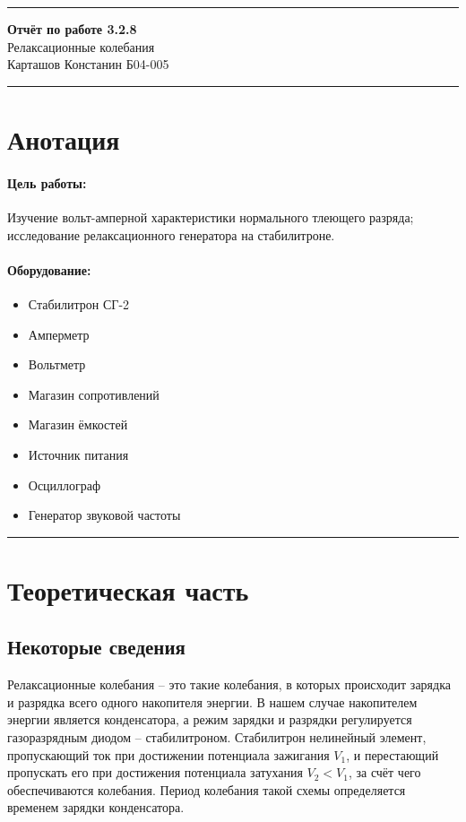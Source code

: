 \documentclass[a4paper,12pt]{article} %
\begin{document}


\hrule 	
\medskip
\begin{raggedright}
{\large \textbf{Отчёт по работе 3.2.8}}
\\
\medskip
{\Large Релаксационные колебания} 
\\
\medskip
{\large Карташов Констанин Б04-005}
\medskip
\hrule
\medskip
\end{raggedright}


\section{Анотация}

\paragraph{Цель работы:} 
Изучение вольт-амперной характеристики нормального
тлеющего разряда; исследование релаксационного генератора на стабилитроне.

\paragraph{Оборудование:}
\begin{itemize}
\renewcommand{\labelitemi}{$\triangleright$}
\itemsep0em
\item Стабилитрон СГ-2
\item Амперметр
\item Вольтметр 
\item Магазин сопротивлений
\item Магазин ёмкостей
\item Источник питания
\item Осциллограф
\item Генератор звуковой частоты
\end{itemize}


\medskip\hrule\medskip

\section{Теоретическая часть}

\subsection{Некоторые сведения}

Релаксационные колебания -- это такие колебания, в которых происходит зарядка и разрядка всего одного накопителя энергии. В нашем случае накопителем энергии является конденсатора, а режим зарядки и разрядки регулируется газоразрядным диодом -- стабилитроном. Стабилитрон нелинейный элемент, пропускающий ток при достижении потенциала зажигания $V_1$, и перестающий пропускать его при достижения потенциала затухания $V_2 < V_1$, за счёт чего обеспечиваются колебания. Период колебания такой схемы определяется временем зарядки конденсатора.
\end{document}
